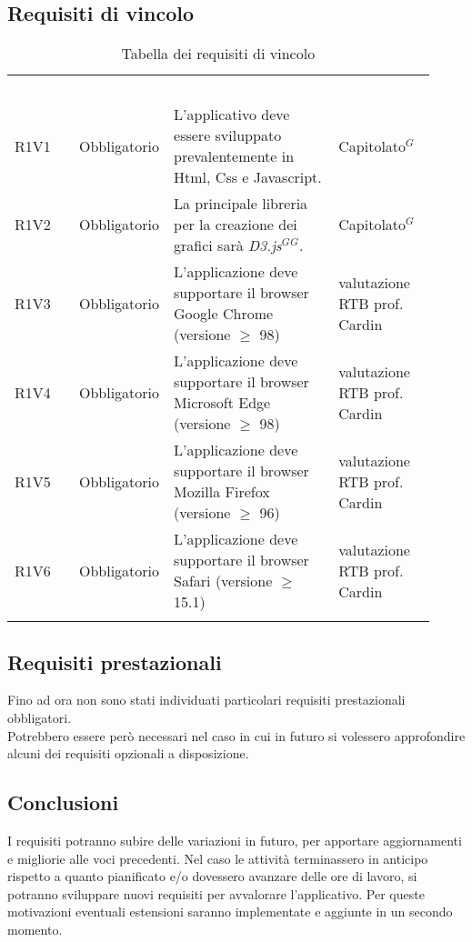 \subsection{Requisiti di vincolo}
{\renewcommand{\arraystretch}{1.5}
\begin{longtable}{p{0.12\linewidth}p{0.15\linewidth}p{0.50\linewidth}p{0.15\linewidth}}
	\rowcolor[RGB]{33, 73, 50}
	\textcolor{white}{\textbf{Codice}} & \textcolor{white}{\textbf{Classe}} & \textcolor{white}{\textbf{Descrizione}} &
    \textcolor{white}{\textbf{Riferimenti}}\\

    \rowcolor[RGB]{216, 235, 171}
    R1V1 & Obbligatorio & L'applicativo deve essere sviluppato prevalentemente in Html, Css e Javascript. & Capitolato$^{G}$\\
    \rowcolor[RGB]{233, 245, 206}
    R1V2 & Obbligatorio & La principale libreria per la creazione dei grafici sarà \textit{D3.js$^{G}$}$^{G}$. & Capitolato$^{G}$\\
    \rowcolor[RGB]{216, 235, 171}
    R1V3 & Obbligatorio & L'applicazione deve supportare il browser Google Chrome (versione $\geq$ 98) & valutazione RTB prof. Cardin \\
    \rowcolor[RGB]{233, 245, 206}
    R1V4 & Obbligatorio & L'applicazione deve supportare il browser Microsoft Edge (versione $\geq$ 98) & valutazione RTB prof. Cardin \\
    \rowcolor[RGB]{216, 235, 171}
    R1V5 & Obbligatorio & L'applicazione deve supportare il browser Mozilla Firefox (versione $\geq$ 96) & valutazione RTB prof. Cardin \\
    \rowcolor[RGB]{233, 245, 206}
    R1V6 & Obbligatorio & L'applicazione deve supportare il browser Safari (versione $\geq$ 15.1) & valutazione RTB prof. Cardin \\

    \caption{Tabella dei requisiti di vincolo}
\end{longtable}
}

\subsection{Requisiti prestazionali}
Fino ad ora non sono stati individuati particolari requisiti prestazionali obbligatori.\\
Potrebbero essere però necessari nel caso in cui in futuro si volessero approfondire alcuni dei requisiti opzionali a disposizione.


\subsection{Conclusioni}
I requisiti potranno subire delle variazioni in futuro, per apportare aggiornamenti e migliorie alle voci precedenti.
Nel caso le attività terminassero in anticipo rispetto a quanto pianificato e/o dovessero avanzare delle ore di lavoro, si potranno sviluppare nuovi
requisiti per avvalorare l'applicativo. Per queste motivazioni eventuali estensioni saranno implementate e aggiunte in un secondo momento.
